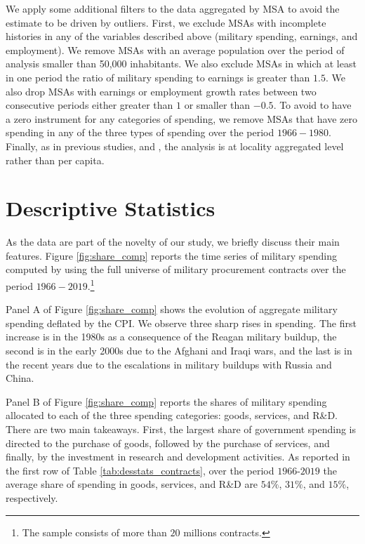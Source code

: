 \documentclass[dv_diss_main.tex]{subfiles}
\begin{document}
We apply some additional filters to the data aggregated by MSA to avoid the estimate to be driven by outliers. First, we exclude MSAs with incomplete histories in any of the variables described above (military spending, earnings, and employment). We remove MSAs with an average population over the period of analysis smaller than 50,000 inhabitants. We also exclude MSAs in which at least in one period the ratio of military spending to earnings is greater than $1.5$. We also drop MSAs with earnings or employment growth rates between two consecutive periods either greater than $1$ or smaller than $-0.5$. To avoid to have a zero instrument for any categories of spending, we remove MSAs that have zero spending in any of the three types of spending over the period $1966-1980$. Finally, as in previous studies, \cite{Auerbach2020} and \cite{Demyanyk2019}, the analysis is at locality aggregated level rather than per capita.









\section{Descriptive Statistics}
\label{sec:des_stats}

As the data are part of the novelty of our study, we briefly discuss their main features. Figure \ref{fig:share_comp} reports the time series of military spending computed by using the full universe of military procurement contracts over the period $1966-2019$.\footnote{The sample consists of more than $20$ millions contracts.} 

Panel A of Figure \ref{fig:share_comp} shows the evolution of aggregate military spending deflated by the CPI. We observe three sharp rises in spending. The first increase is in the 1980s as a consequence of the Reagan military buildup, the second is in the early 2000s due to the Afghani and Iraqi wars, and the last is in the recent years due to the escalations in military buildups with Russia and China.

Panel B of Figure \ref{fig:share_comp} reports the shares of military spending allocated to each of the three spending categories: goods, services, and R\&D. There are two main takeaways. First, the largest share of government spending is directed to the purchase of goods, followed by the purchase of services, and finally, by the investment in research and development activities. As reported in the first row of Table \ref{tab:desstats_contracts}, over the period $1966$-$2019$ the average share of spending in goods, services, and R\&D are $54\%$, $31\%$, and $15\%$, respectively.
\end{document}
